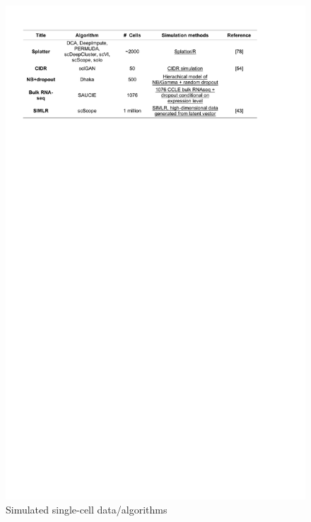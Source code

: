 \documentclass[
]{book}
\begin{document}
\begin{figure}

{\centering \includegraphics[width=20in]{Table/Table2a} 

}

\caption{Simulated single-cell data/algorithms}\label{fig:Table2a}
\end{figure}
\end{document}
